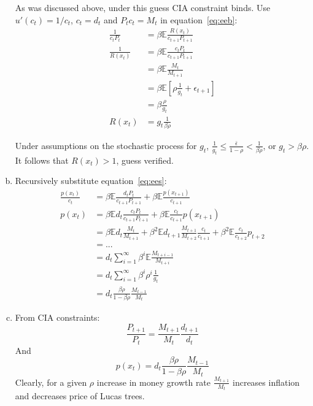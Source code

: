 \documentclass{article}
\newcommand{\E}{\mathbb{E}}
\begin{document}
\begin{enumerate}[(a)]
  As was discussed above, under this guess CIA constraint binds. Use
  $u'(c_t)=1/c_t$, $c_t=d_t$ and $P_tc_t=M_t$ in
  equation~\eqref{eq:eeb}:\
  \begin{align*}
    \frac{1}{c_tP_t}&=\beta\E\frac{R(x_t)}{c_{t+1}P_{t+1}}\\
    \frac{1}{R(x_t)}&=\beta\E\frac{c_tP_t}{c_{t+1}P_{t+1}}\\
                    &=\beta\E\frac{M_t}{M_{t+1}}\\
                    &=\beta\E[\rho\frac{1}{g_t}+\epsilon_{t+1}]\\
                    &=\beta\frac{\rho}{g_t}\\
    R(x_t)&=g_t\frac{1}{\beta\rho}
  \end{align*}

  Under assumptions on the stochastic process for $g_t$,
  $\frac{1}{g_t}\le\frac{\bar{\epsilon}}{1-\rho}<\frac{1}{\beta\rho}$,
  or $g_t>\beta\rho$. It follows that $R(x_t)>1$, guess verified.

\item Recursively substitute equation~\eqref{eq:ees}:
  \begin{align*}
    \frac{p(x_t)}{c_t}&=\beta\E\frac{d_tP_t}{c_{t+1}P_{t+1}} + \beta\E\frac{p(x_{t+1})}{c_{t+1}}\\
    p(x_t)&=\beta\E d_t\frac{c_tP_t}{c_{t+1}P_{t+1}} + \beta\E\frac{c_t}{c_{t+1}}p(x_{t+1})\\
                      &=\beta\E d_t\frac{M_t}{M_{t+1}}+\beta^2\E d_{t+1}\frac{M_{t+1}}{M_{t+2}}\frac{c_t}{c_{t+1}}+\beta^2\E\frac{c_t}{c_{t+2}}p_{t+2}\\
                      &=...\\
                      &=d_t\sum_{i=1}^\infty\beta^i\E\frac{M_{t+i-1}}{M_{t+i}}\\
                      &=d_t\sum_{i=1}^\infty\beta^i\rho^i\frac{1}{g_t}\\
                      &=d_t\frac{\beta\rho}{1-\beta\rho}\frac{M_{t-1}}{M_t}
  \end{align*}

\item From CIA constraints:
  \begin{equation*}
    \frac{P_{t+1}}{P_t}=\frac{M_{t+1}}{M_t}\frac{d_{t+1}}{d_t}
  \end{equation*}
  And 
  \begin{equation*}
    p(x_t)=d_t\frac{\beta\rho}{1-\beta\rho}\frac{M_{t-1}}{M_t}
  \end{equation*}
  Clearly, for a given $\rho$ increase in money growth rate
  $\frac{M_{t+1}}{M_t}$ increases inflation and decreases price of
  Lucas trees.


\end{enumerate}
\end{document}
